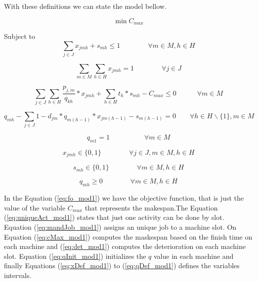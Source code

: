 \documentclass[a4paper,11pt]{article}
\begin{document}
With these definitions we can state the model bellow. 

\begin{equation}\label{eq:fo_mod1}
	\min C_{max}
\end{equation}

Subject to
\begin{equation}\label{eq:uniqueAct_mod1}	
 \sum_{j \in J}{x_{jmh}} +  s_{mh} \leq 1 \quad\quad\quad\quad \forall m \in M, h \in H 
\end{equation}

\begin{equation}\label{eq:mandJob_mod1}
	\sum_{m \in M}\sum_{h \in H}{x_{jmh}} = 1 \quad\quad\quad\quad \forall j \in J
\end{equation}
 
\begin{equation}\label{eq:cMax_mod1}
	\sum_{j \in J}\sum_{h \in H}{\frac{p_{j,m}}{q_{kh}}*x_{jmh}} + \sum_{h \in H}{t_h}*s_{mh} - C_{max} \leq 0 \quad \quad \quad \forall m \in M 
\end{equation} 
 
\begin{equation}\label{eq:det_mod1}
	q_{mh} - \sum_{j \in J}{1-d_{jm}}*q_{m(h-1)}*x_{jm(h-1)} - s_{m(h-1)} = 0 \quad\quad \forall h \in H\backslash\{1\} , m \in M
\end{equation} 

\begin{equation}\label{eq:qInit_mod1}
q_{m1} = 1 \quad\quad\quad\quad\quad \forall m \in M
\end{equation}

\begin{equation}\label{eq:xDef_mod1}
    x_{jmh} \in \{0,1\} \quad \quad \quad \quad \forall j \in J, m \in M, h \in H
\end{equation}

\begin{equation}\label{eq:dDef_mod1}
    s_{mh} \in \{0,1\} \quad \quad \quad \quad \forall m \in M, h \in H
\end{equation}

\begin{equation}\label{eq:qDef_mod1}
    q_{mh} \geq 0 \quad \quad \quad \quad \forall  m \in M, h \in H
\end{equation}

In the Equation (\ref{eq:fo_mod1}) we have the objective function, that is just the value of the variable $C_{max}$ that represents the makespan.The Equation (\ref{eq:uniqueAct_mod1}) states that just one activity can be done by slot. Equation (\ref{eq:mandJob_mod1}) assigns an unique job to a machine slot. On Equation  (\ref{eq:cMax_mod1}) computes the maskespan based on the finish time on each machine and (\ref{eq:det_mod1}) computes the deterioration on each machine slot. Equation (\ref{eq:qInit_mod1}) initializes the $q$ value in each machine and finally Equations (\ref{eq:xDef_mod1}) to (\ref{eq:qDef_mod1}) defines the variables intervals. 
\end{document}
